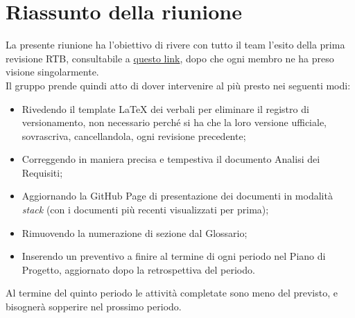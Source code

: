 \section{Riassunto della riunione}
La presente riunione ha l'obiettivo di rivere con tutto il team l'esito della prima revisione RTB, consultabile a \href{https://www.math.unipd.it/~tullio/IS-1/2024/Progetto/RTB/PEBKAC.pdf}{questo link}, dopo che ogni membro ne ha preso visione singolarmente.
\\
Il gruppo prende quindi atto di dover intervenire al più presto nei seguenti modi:
\begin{itemize}
    \item Rivedendo il template LaTeX dei verbali per eliminare il registro di versionamento, non necessario perché si ha che la
loro versione ufficiale, sovrascriva, cancellandola, ogni revisione
precedente;
\item Correggendo in maniera precisa e tempestiva il documento Analisi dei Requisiti;
    \item Aggiornando la GitHub Page di presentazione dei documenti in modalità \textit{stack} (con i documenti più recenti visualizzati per prima);
    \item Rimuovendo la numerazione di sezione dal Glossario;
    \item Inserendo un preventivo a finire al termine di ogni periodo nel Piano di Progetto, aggiornato dopo la retrospettiva del periodo.

\end{itemize}

Al termine del quinto periodo le attività completate sono meno del previsto, e bisognerà sopperire nel prossimo periodo. 

